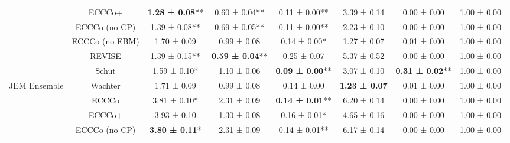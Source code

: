 \begin{table}
{\begin{tabular}[t]{cccccccc}
 & ECCCo+ & \textbf{1.28 ± 0.08}** & 0.60 ± 0.04** & 0.11 ± 0.00** & 3.39 ± 0.14\hphantom{*}\hphantom{*} & 0.00 ± 0.00\hphantom{*}\hphantom{*} & 1.00 ± 0.00\hphantom{*}\hphantom{*}\\

 & ECCCo (no CP) & 1.39 ± 0.08** & 0.69 ± 0.05** & 0.11 ± 0.00** & 2.23 ± 0.10\hphantom{*}\hphantom{*} & 0.00 ± 0.00\hphantom{*}\hphantom{*} & 1.00 ± 0.00\hphantom{*}\hphantom{*}\\

 & ECCCo (no EBM) & 1.70 ± 0.09\hphantom{*}\hphantom{*} & 0.99 ± 0.08\hphantom{*}\hphantom{*} & 0.14 ± 0.00*\hphantom{*} & 1.27 ± 0.07\hphantom{*}\hphantom{*} & 0.01 ± 0.00\hphantom{*}\hphantom{*} & 1.00 ± 0.00\hphantom{*}\hphantom{*}\\

 & REVISE & 1.39 ± 0.15** & \textbf{0.59 ± 0.04}** & 0.25 ± 0.07\hphantom{*}\hphantom{*} & 5.37 ± 0.52\hphantom{*}\hphantom{*} & 0.00 ± 0.00\hphantom{*}\hphantom{*} & 1.00 ± 0.00\hphantom{*}\hphantom{*}\\

 & Schut & 1.59 ± 0.10*\hphantom{*} & 1.10 ± 0.06\hphantom{*}\hphantom{*} & \textbf{0.09 ± 0.00}** & 3.07 ± 0.10\hphantom{*}\hphantom{*} & \textbf{0.31 ± 0.02}** & 1.00 ± 0.00\hphantom{*}\hphantom{*}\\

\multirow[t]{-7}{*}{\centering\arraybackslash JEM Ensemble} & Wachter & 1.71 ± 0.09\hphantom{*}\hphantom{*} & 0.99 ± 0.08\hphantom{*}\hphantom{*} & 0.14 ± 0.00\hphantom{*}\hphantom{*} & \textbf{1.23 ± 0.07}\hphantom{*}\hphantom{*} & 0.01 ± 0.00\hphantom{*}\hphantom{*} & 1.00 ± 0.00\hphantom{*}\hphantom{*}\\
\cmidrule{1-8}
 & ECCCo & 3.81 ± 0.10*\hphantom{*} & 2.31 ± 0.09\hphantom{*}\hphantom{*} & \textbf{0.14 ± 0.01}** & 6.20 ± 0.14\hphantom{*}\hphantom{*} & 0.00 ± 0.00\hphantom{*}\hphantom{*} & 1.00 ± 0.00\hphantom{*}\hphantom{*}\\

 & ECCCo+ & 3.93 ± 0.10\hphantom{*}\hphantom{*} & 1.30 ± 0.08\hphantom{*}\hphantom{*} & 0.16 ± 0.01*\hphantom{*} & 4.65 ± 0.16\hphantom{*}\hphantom{*} & 0.00 ± 0.00\hphantom{*}\hphantom{*} & 1.00 ± 0.00\hphantom{*}\hphantom{*}\\

 & ECCCo (no CP) & \textbf{3.80 ± 0.11}*\hphantom{*} & 2.31 ± 0.09\hphantom{*}\hphantom{*} & 0.14 ± 0.01** & 6.17 ± 0.14\hphantom{*}\hphantom{*} & 0.00 ± 0.00\hphantom{*}\hphantom{*} & 1.00 ± 0.00\hphantom{*}\hphantom{*}\\


\end{tabular}}
\end{table}
